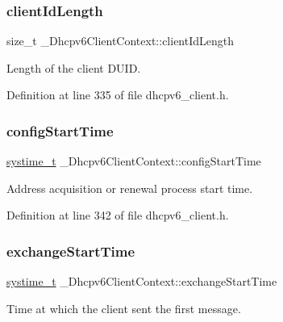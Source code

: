 \subsubsection{\texorpdfstring{client\+Id\+Length}{clientIdLength}}
{\footnotesize\ttfamily size\+\_\+t \+\_\+\+Dhcpv6\+Client\+Context\+::client\+Id\+Length}



Length of the client D\+U\+ID. 



Definition at line 335 of file dhcpv6\+\_\+client.\+h.

\mbox{\label{struct__Dhcpv6ClientContext_afb96412e382590b9bbf877a7ebfc46f7}} 
\subsubsection{\texorpdfstring{config\+Start\+Time}{configStartTime}}
{\footnotesize\ttfamily \hyperlink{compiler__port_8h_ae3e32a98d431a02106616da3071832dd}{systime\+\_\+t} \+\_\+\+Dhcpv6\+Client\+Context\+::config\+Start\+Time}



Address acquisition or renewal process start time. 



Definition at line 342 of file dhcpv6\+\_\+client.\+h.

\mbox{\label{struct__Dhcpv6ClientContext_ac0cae52199afa7b555e7448171b8b675}} 
\subsubsection{\texorpdfstring{exchange\+Start\+Time}{exchangeStartTime}}
{\footnotesize\ttfamily \hyperlink{compiler__port_8h_ae3e32a98d431a02106616da3071832dd}{systime\+\_\+t} \+\_\+\+Dhcpv6\+Client\+Context\+::exchange\+Start\+Time}



Time at which the client sent the first message. 



